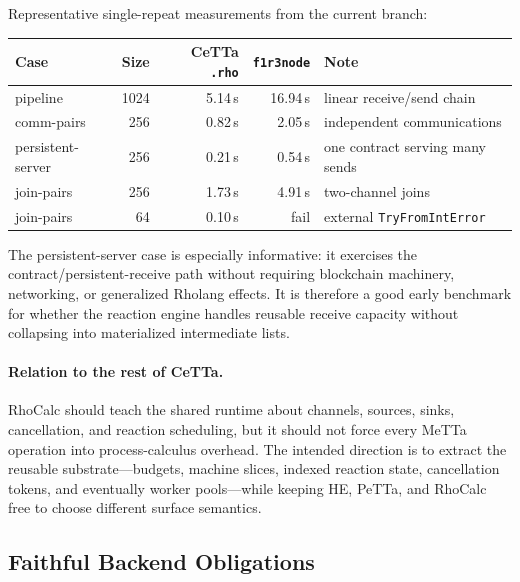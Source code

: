\documentclass[11pt]{article}
\newcommand{\code}[1]{\texttt{#1}}
\newcommand{\PeTTa}{\textup{PeTTa}}
\newcommand{\HE}{\textup{HE}}
\newcommand{\CeTTa}{\textup{CeTTa}}
\newcommand{\RhoCalc}{\textup{RhoCalc}}
\begin{document}
Representative single-repeat measurements from the current branch:
\begin{center}
\begin{tabular}{lrrrl}
\toprule
Case & Size & \CeTTa{} \code{.rho} & \code{f1r3node} & Note \\
\midrule
pipeline & 1024 & 5.14\,s & 16.94\,s & linear receive/send chain \\
comm-pairs & 256 & 0.82\,s & 2.05\,s & independent communications \\
persistent-server & 256 & 0.21\,s & 0.54\,s & one contract serving many sends \\
join-pairs & 256 & 1.73\,s & 4.91\,s & two-channel joins \\
join-pairs & 64 & 0.10\,s & fail & external \code{TryFromIntError} \\
\bottomrule
\end{tabular}
\end{center}

The persistent-server case is especially informative: it exercises the
contract/persistent-receive path without requiring blockchain machinery,
networking, or generalized Rholang effects.  It is therefore a good early
benchmark for whether the reaction engine handles reusable receive capacity
without collapsing into materialized intermediate lists.

\paragraph{Relation to the rest of \CeTTa{}.}
\RhoCalc{} should teach the shared runtime about channels, sources, sinks,
cancellation, and reaction scheduling, but it should not force every MeTTa
operation into process-calculus overhead.  The intended direction is to extract
the reusable substrate---budgets, machine slices, indexed reaction state,
cancellation tokens, and eventually worker pools---while keeping \HE{},
\PeTTa{}, and \RhoCalc{} free to choose different surface semantics.

\subsection{Faithful Backend Obligations}
\end{document}
